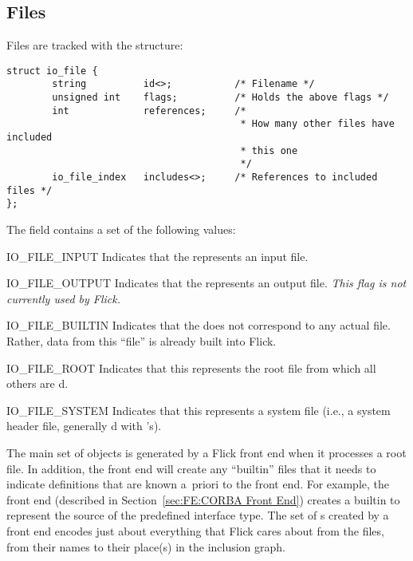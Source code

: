 

\subsection{Files}
\label{subsec:META:Files}

Files are tracked with the  structure:

\begin{verbatim}
struct io_file {
        string          id<>;           /* Filename */
        unsigned int    flags;          /* Holds the above flags */
        int             references;     /*
                                         * How many other files have included
                                         * this one
                                         */
        io_file_index   includes<>;     /* References to included files */
};
\end{verbatim}

\noindent The  field contains a set of the following values:

\begin{cidentifierlist}
  \item[IO_FILE_INPUT] Indicates that the  represents an input
  file.

  \item[IO_FILE_OUTPUT] Indicates that the  represents an output
  file.  \emph{This flag is not currently used by Flick.}

  \item[IO_FILE_BUILTIN] Indicates that the  does not correspond
  to any actual file.  Rather, data from this ``file'' is already built into
  Flick.

  \item[IO_FILE_ROOT] Indicates that this  represents the root
  \IDL{} file from which all others are d.

  \item[IO_FILE_SYSTEM] Indicates that this  represents a system
  file (i.e., a system header file, generally d with
  \cidentifier{<>}'s).
\end{cidentifierlist}

The main set of  objects is generated by a Flick front end when
it processes a root \IDL{} file.  In addition, the front end will create any
``builtin'' files that it needs to indicate definitions that are known a~priori
to the front end.  For example, the \CORBA{} front end (described in
Section~\ref{sec:FE:CORBA Front End}) creates a builtin  to
represent the source of the predefined  interface type.  The
set of s created by a front end encodes just about everything
that Flick cares about from the files, from their names to their place(s) in
the inclusion graph.

